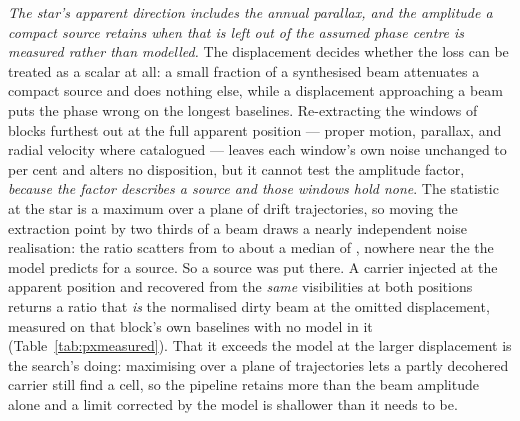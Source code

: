 \emph{The star's apparent direction includes the annual parallax, and the
amplitude a compact source retains when that is left out of the assumed phase
centre is measured rather than modelled.} The displacement decides whether the
loss can be treated as a scalar at all: a small fraction of a synthesised beam
attenuates a compact source and does nothing else, while a displacement
approaching a beam puts the phase wrong on the longest baselines. Re-extracting
the \SensNReextWin{} windows of \SensNReextBlock{} blocks furthest out at the
full apparent position --- proper motion, parallax, and radial velocity where
catalogued --- leaves each window's own noise unchanged to
\SensReextNoiseMaxPct{} per cent and alters no disposition, but it cannot test
the amplitude factor, \emph{because the factor describes a source and those
windows hold none}. The statistic at the star is a maximum over a plane of
drift trajectories, so moving the extraction point by two thirds of a beam
draws a nearly independent noise realisation: the ratio scatters from
\SensReTstarLo{} to \SensReTstarHi{} about a median of \SensReTstarMed,
nowhere near the \SensPxLargePred{} the model predicts for a source. So a
source was put there. A carrier injected at the apparent position and recovered
from the \emph{same} visibilities at both positions returns a ratio that
\emph{is} the normalised dirty beam at the omitted displacement, measured on
that block's own baselines with no model in it
(Table~\ref{tab:pxmeasured}). That it exceeds the model at the larger
displacement is the search's doing: maximising over a plane of trajectories
lets a partly decohered carrier still find a cell, so the pipeline retains more
than the beam amplitude alone and a limit corrected by the model is shallower
than it needs to be.

\begin{table}
\centering
\caption{\textbf{The amplitude retained at a mis-assumed stellar position,
measured.} A carrier injected at the star's apparent position and recovered
from the same visibilities twice: once with the extraction phase-rotated to
that position, once to the parallax-free one. The ratio of recovered
signal-to-noise is the normalised dirty beam at the omitted displacement; the
prediction is the model each window's own correction uses.}
\label{tab:pxmeasured}
\footnotesize

\end{table}

